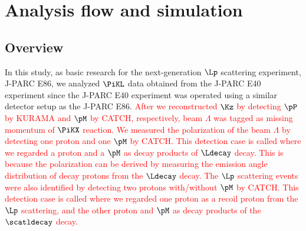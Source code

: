 %

\graphicspath{{./pictures/chapter_Anaflow/}}

\chapter{Analysis flow and simulation} 
\label{chap-Anaflow}

\section{Overview}
\label{sec-overview}
In this study, as basic research for the next-generation $\Lp$ scattering experiment, J-PARC E86, we analyzed $\PiKL$ data obtained from the J-PARC E40 experiment since the J-PARC E40 experiment was operated using a similar detector setup as the J-PARC E86. 
\textcolor{red}{ After we reconstructed $\Kz$ by detecting $\pP$ by KURAMA and $\pM$ by CATCH, respectively, beam $\Lambda$ was tagged as missing momentum of $\PiKX$ reaction. We measured the polarization of the beam $\Lambda$ by detecting one proton and one $\pM$ by CATCH. This detection case is called  where we regarded a proton and a $\pM$ as decay products of $\Ldecay$ decay. This is because the polarization can be derived by measuring the emission angle distribution of decay protons from the $\Ldecay$ decay. The $\Lp$ scattering events were also identified by detecting two protons with/without $\pM$ by CATCH. This detection case is called  where we regarded one proton as a recoil proton from the $\Lp$ scattering, and the other proton and $\pM$ as decay products of the $\scatldecay$ decay. }

